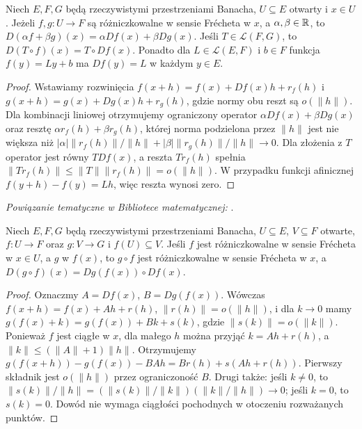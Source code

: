 \begin{stwierdzenie}
\label{prop:sum-linear14}
Niech $E,F,G$ będą rzeczywistymi przestrzeniami Banacha, $U\subseteq E$ otwarty i $x\in U$. Jeżeli $f,g:U\to F$ są różniczkowalne w sensie Frécheta w $x$, a $\alpha,\beta\in\mathbb R$, to $D(\alpha f+\beta g)(x)=\alpha Df(x)+\beta Dg(x)$. Jeśli $T\in\mathcal L(F,G)$, to $D(T\circ f)(x)=T\circ Df(x)$. Ponadto dla $L\in\mathcal L(E,F)$ i $b\in F$ funkcja $f(y)=Ly+b$ ma $Df(y)=L$ w każdym $y\in E$.
\end{stwierdzenie}
\begin{proof}
Wstawiamy rozwinięcia $f(x+h)=f(x)+Df(x)h+r_f(h)$ i $g(x+h)=g(x)+Dg(x)h+r_g(h)$, gdzie normy obu reszt są $o(\|h\|)$. Dla kombinacji liniowej otrzymujemy ograniczony operator $\alpha Df(x)+\beta Dg(x)$ oraz resztę $\alpha r_f(h)+\beta r_g(h)$, której norma podzielona przez $\|h\|$ jest nie większa niż $|\alpha|\|r_f(h)\|/\|h\|+|\beta|\|r_g(h)\|/\|h\|\to0$. Dla złożenia z $T$ operator jest równy $TDf(x)$, a reszta $Tr_f(h)$ spełnia $\|Tr_f(h)\|\le\|T\|\|r_f(h)\|=o(\|h\|)$. W przypadku funkcji afinicznej $f(y+h)-f(y)=Lh$, więc reszta wynosi zero.
\end{proof}

\noindent\emph{Powiązanie tematyczne w Bibliotece matematycznej:} .

\begin{twierdzenie}
\label{thm:chain14}
Niech $E,F,G$ będą rzeczywistymi przestrzeniami Banacha, $U\subseteq E$, $V\subseteq F$ otwarte, $f:U\to F$ oraz $g:V\to G$ i $f(U)\subseteq V$. Jeśli $f$ jest różniczkowalne w sensie Frécheta w $x\in U$, a $g$ w $f(x)$, to $g\circ f$ jest różniczkowalne w sensie Frécheta w $x$, a
$D(g\circ f)(x)=Dg(f(x))\circ Df(x)$.
\end{twierdzenie}
\begin{proof}
Oznaczmy $A=Df(x)$, $B=Dg(f(x))$. Wówczas $f(x+h)=f(x)+Ah+r(h)$, $\|r(h)\|=o(\|h\|)$, i dla $k\to0$ mamy $g(f(x)+k)=g(f(x))+Bk+s(k)$, gdzie $\|s(k)\|=o(\|k\|)$. Ponieważ $f$ jest ciągłe w $x$, dla małego $h$ można przyjąć $k=Ah+r(h)$, a $\|k\|\le(\|A\|+1)\|h\|$. Otrzymujemy
$g(f(x+h))-g(f(x))-BAh=Br(h)+s(Ah+r(h))$.
Pierwszy składnik jest $o(\|h\|)$ przez ograniczoność $B$. Drugi także: jeśli $k\ne0$, to
$\|s(k)\|/\|h\|=(\|s(k)\|/\|k\|)(\|k\|/\|h\|)\to0$;
jeśli $k=0$, to $s(k)=0$. Dowód nie wymaga ciągłości pochodnych w otoczeniu rozważanych punktów.
\end{proof}

